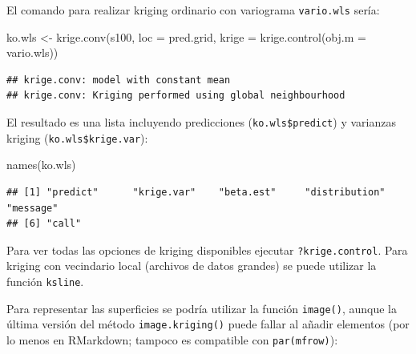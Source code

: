 \documentclass[
  spanish,
]{book}
\newenvironment{Shaded}{\begin{snugshade}}{\end{snugshade}}
\newcommand{\AttributeTok}[1]{\textcolor[rgb]{0.77,0.63,0.00}{#1}}
\newcommand{\CommentTok}[1]{\textcolor[rgb]{0.56,0.35,0.01}{\textit{#1}}}
\newcommand{\ConstantTok}[1]{\textcolor[rgb]{0.00,0.00,0.00}{#1}}
\newcommand{\FunctionTok}[1]{\textcolor[rgb]{0.00,0.00,0.00}{#1}}
\newcommand{\NormalTok}[1]{#1}
\newcommand{\OtherTok}[1]{\textcolor[rgb]{0.56,0.35,0.01}{#1}}
\newcommand{\SpecialCharTok}[1]{\textcolor[rgb]{0.00,0.00,0.00}{#1}}
\newcommand{\StringTok}[1]{\textcolor[rgb]{0.31,0.60,0.02}{#1}}
\theoremstyle{break}
\begin{document}
El comando para realizar kriging ordinario con variograma \texttt{vario.wls}
sería:

\begin{Shaded}
\begin{Highlighting}[]
\NormalTok{ko.wls }\OtherTok{\textless{}{-}} \FunctionTok{krige.conv}\NormalTok{(s100, }\AttributeTok{loc =}\NormalTok{ pred.grid, }\AttributeTok{krige =} \FunctionTok{krige.control}\NormalTok{(}\AttributeTok{obj.m =}\NormalTok{ vario.wls))}
\end{Highlighting}
\end{Shaded}

\begin{verbatim}
## krige.conv: model with constant mean
## krige.conv: Kriging performed using global neighbourhood
\end{verbatim}

El resultado es una lista incluyendo predicciones (\texttt{ko.wls\$predict}) y
varianzas kriging (\texttt{ko.wls\$krige.var}):

\begin{Shaded}
\begin{Highlighting}[]
\FunctionTok{names}\NormalTok{(ko.wls)}
\end{Highlighting}
\end{Shaded}

\begin{verbatim}
## [1] "predict"      "krige.var"    "beta.est"     "distribution" "message"     
## [6] "call"
\end{verbatim}

Para ver todas las opciones de kriging disponibles ejecutar
\texttt{?krige.control}. Para kriging con vecindario local (archivos de datos
grandes) se puede utilizar la función \texttt{ksline}.

Para representar las superficies se podría utilizar la función \texttt{image()},
aunque la última versión del método \texttt{image.kriging()} puede fallar al añadir
elementos (por lo menos en RMarkdown; tampoco es compatible con \texttt{par(mfrow)}):

\begin{Shaded}
\end{Shaded}
\end{document}
